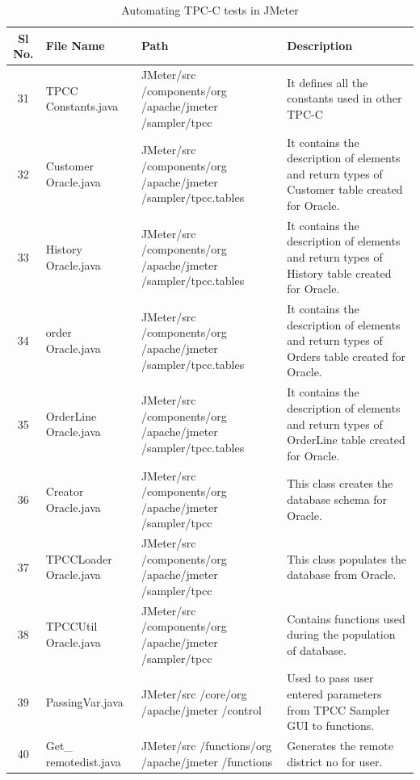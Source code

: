 \documentclass[12pt]{book}
\begin{document}
   \begin{table}[H]
  \begin{center}
   \begin{tabular}{|c|p{3cm}|p{4cm}|p{6cm}|} 
   \hline
   \textbf{Sl No.} & \textbf{File Name} & \textbf{Path} & \textbf{Description}\\
   \hline
   31 & TPCC Constants.java & JMeter/src /components/org /apache/jmeter /sampler/tpcc & It defines all the constants used in other TPC-C\\
   \hline
   32 & Customer Oracle.java & JMeter/src /components/org /apache/jmeter /sampler/tpcc.tables  & It contains the description of elements and return types of Customer table created for Oracle.\\
   \hline 
   33 & History Oracle.java & JMeter/src /components/org /apache/jmeter /sampler/tpcc.tables & It contains the description of elements and return types of History table created for Oracle.\\
   \hline
   34 & order Oracle.java & JMeter/src /components/org /apache/jmeter /sampler/tpcc.tables & It contains the description of elements and return types of Orders table created for Oracle.\\
   \hline
   35 & OrderLine Oracle.java & JMeter/src /components/org /apache/jmeter /sampler/tpcc.tables & It contains the description of elements and return types of OrderLine table created for Oracle. \\
   \hline 
   36 & Creator Oracle.java & JMeter/src /components/org /apache/jmeter /sampler/tpcc & This class creates the database schema for Oracle.\\
   \hline 
   37 & TPCCLoader Oracle.java & JMeter/src /components/org /apache/jmeter /sampler/tpcc & This class populates the database from Oracle.\\
   \hline
   38 & TPCCUtil Oracle.java & JMeter/src /components/org /apache/jmeter /sampler/tpcc & Contains functions used during the population of database. \\
   \hline
   39 & PassingVar.java & JMeter/src /core/org /apache/jmeter /control & Used to pass user entered parameters from TPCC Sampler GUI to functions.\\
   \hline 
   40 &  Get\_ remotedist.java & JMeter/src /functions/org /apache/jmeter /functions & Generates the remote district no for user.\\
   \hline
   \end{tabular}
   \caption{Automating TPC-C tests in JMeter}
  \end{center}
 \end{table}
 
\end{document}
